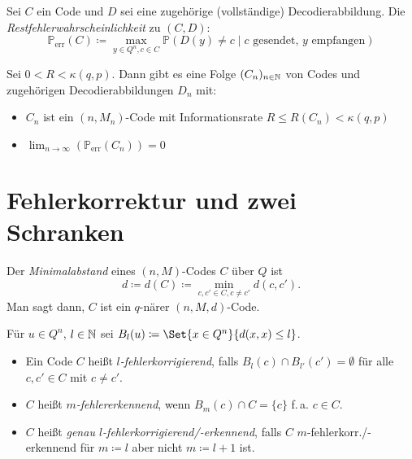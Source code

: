 \documentclass{cheat-sheet}
\renewcommand{\P}{\mathbb{P}} %
\newcommand{\CP}[2]{\P({#1}\mid{#2})} %
\newcommand{\err}{\text{err}} %
\begin{document}


\begin{defn}
  Sei $C$ ein Code und $D$ sei eine zugehörige (vollständige) Decodierabbildung.
  Die \emph{Restfehlerwahrscheinlichkeit} zu $(C, D)$:
  \[ \P_{\text{err}}(C) \coloneqq \max_{y \in Q^n, c \in C} \CP{D(y) \neq c}{\text{$c$ gesendet, $y$ empfangen}} \]
\end{defn}

\begin{samepage}

\begin{satz}
  Sei $0 < R < \kappa(q, p)$.
  Dann gibt es eine Folge $(C_n)_{n \in \mathbb{N}}$ von Codes und zugehörigen Decodierabbildungen $D_n$ mit: %
  \begin{itemize}
    \item $C_n$ ist ein $(n, M_n)$-Code mit Informationsrate $R \!\leq\! R(C_n) \!<\! \kappa(q, p)$
    \item $\lim_{n \to \infty} \left( \P_\err(C_n) \right) = 0$
  \end{itemize}
\end{satz}

\section{Fehlerkorrektur und zwei Schranken}

\end{samepage}


\begin{defn}
  Der \emph{Minimalabstand} eines $(n, M)$-Codes $C$ über $Q$ ist
  \[ d \coloneqq d(C) \coloneqq \min_{c,c' \in C, c \neq c'} d(c,c'). \]
  Man sagt dann, $C$ ist ein $q$-närer $(n, M, d)$-Code.
\end{defn}

\begin{nota}
  Für $u \in Q^n$, $l \in \mathbb{N}$ sei $B_l(u) \coloneqq \Set{x \in Q^n}{d(x, x) \leq l}$.
\end{nota}

\begin{defn}
  \begin{itemize}
    \item Ein Code $C$ heißt \emph{$l$-fehlerkorrigierend}, falls $B_l(c) \cap B_{l'}(c') = \emptyset$ für alle $c, c' \in C$ mit $c \neq c'$.
    \item $C$ heißt \emph{$m$-fehlererkennend}, wenn $B_m(c) \cap C = \{ c \}$ f.\,a. $c \in C$.
    \item $C$ heißt \emph{genau $l$-fehlerkorrigierend/-erkennend}, falls $C$ $m$-fehlerkorr./-erkennend für $m \coloneqq l$ aber nicht $m \coloneqq l+1$ ist.
  \end{itemize}
\end{defn}
\end{document}
